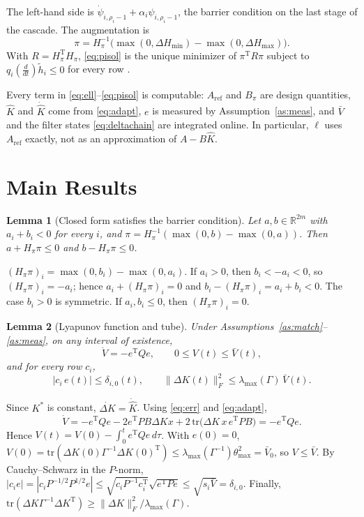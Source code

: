 \documentclass[lettersize,journal]{IEEEtran}
\newtheorem{lemma}{Lemma}
\newcommand{\Kh}{\hat{K}}
\newcommand{\Khd}{\dot{\hat{K}}}
\newcommand{\Ar}{A_{\mathrm{ref}}}
\newcommand{\Vb}{\bar{V}}
\newcommand{\tmax}{\theta_{\max}}
\newcommand{\T}{\mathrm{T}}
\newcommand{\R}{\mathbb{R}}
\begin{document}
The left-hand side is $\dot\psi_{i,\rho_i-1}+\alpha_i\psi_{i,\rho_i-1}$, the barrier condition on the last stage of the cascade. The augmentation is
\begin{equation}
\pi = H_\pi^{-1}\big(\max(0,\Delta H_{\min}) - \max(0,\Delta H_{\max})\big). \label{eq:pisol}
\end{equation}
With $R=H_\pi^\T H_\pi$, \eqref{eq:pisol} is the unique minimizer of $\pi^\T R\pi$ subject to $q_i(\frac{d}{dt})\tilde h_i\le0$ for every row \cite[Th.~2]{lavretsky2025}.

Every term in \eqref{eq:ell}--\eqref{eq:pisol} is computable: $\Ar$ and $B_\pi$ are design quantities, $\Kh$ and $\Khd$ come from \eqref{eq:adapt}, $e$ is measured by Assumption~\ref{as:meas}, and $\Vb$ and the filter states \eqref{eq:deltachain} are integrated online. In particular, $\ell$ uses $\Ar$ exactly, not as an approximation of $A-B\Kh$.

\section{Main Results}

\begin{lemma}[Closed form satisfies the barrier condition] \label{lem:closed}
Let $a,b\in\R^{2m}$ with $a_i+b_i<0$ for every $i$, and $\pi=H_\pi^{-1}(\max(0,b)-\max(0,a))$. Then $a+H_\pi\pi\le0$ and $b-H_\pi\pi\le0$.
\end{lemma}
\begin{IEEEproof}
$(H_\pi\pi)_i=\max(0,b_i)-\max(0,a_i)$. If $a_i>0$, then $b_i<-a_i<0$, so $(H_\pi\pi)_i=-a_i$; hence $a_i+(H_\pi\pi)_i=0$ and $b_i-(H_\pi\pi)_i=a_i+b_i<0$. The case $b_i>0$ is symmetric. If $a_i,b_i\le0$, then $(H_\pi\pi)_i=0$.
\end{IEEEproof}

\begin{lemma}[Lyapunov function and tube] \label{lem:tube}
Under Assumptions~\ref{as:match}--\ref{as:meas}, on any interval of existence,
\begin{equation}
\dot V=-e^\T Q e,\qquad 0\le V(t)\le\Vb(t), \label{eq:Vdot}
\end{equation}
and for every row $c_i$,
\begin{equation}
|c_i\,e(t)|\le\delta_{i,0}(t),\qquad \|\Delta K(t)\|_F^2\le\lambda_{\max}(\Gamma)\,\Vb(t). \label{eq:tubebound}
\end{equation}
\end{lemma}
\begin{IEEEproof}
Since $K^*$ is constant, $\dot{\Delta K}=\Khd$. Using \eqref{eq:err} and \eqref{eq:adapt},
\begin{equation*}
\dot V = -e^\T Q e - 2e^\T PB\Delta K x + 2\,\mathrm{tr}\big(\Delta K\,x\,e^\T PB\big) = -e^\T Q e.
\end{equation*}
Hence $V(t)=V(0)-\int_0^t e^\T Q e\,d\tau$. With $e(0)=0$, $V(0)=\mathrm{tr}(\Delta K(0)\Gamma^{-1}\Delta K(0)^\T)\le\lambda_{\max}(\Gamma^{-1})\tmax^2=\Vb_0$, so $V\le\Vb$. By Cauchy--Schwarz in the $P$-norm, $|c_ie|=|c_iP^{-1/2}P^{1/2}e|\le\sqrt{c_iP^{-1}c_i^\T}\sqrt{e^\T Pe}\le\sqrt{s_i\Vb}=\delta_{i,0}$. Finally, $\mathrm{tr}(\Delta K\Gamma^{-1}\Delta K^\T)\ge\|\Delta K\|_F^2/\lambda_{\max}(\Gamma)$.
\end{IEEEproof}
\end{document}
